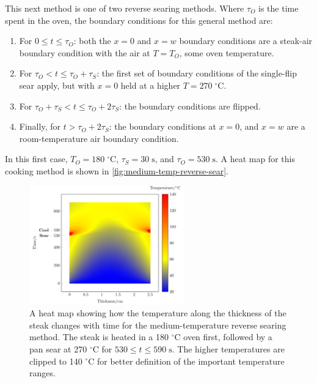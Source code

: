 \documentclass[11pt]{article}
\begin{document}
	This next method is one of two reverse searing methods. Where $\tau_O$ is the time spent in the oven, the boundary conditions for this general method are:
	\begin{enumerate}
		\item For $0 \leq t \leq \tau_O$: both the $x=0$ and $x=w$ boundary conditions are a steak-air boundary condition with the air at $T=T_O$, some oven temperature.
		\item For $\tau_O < t \leq \tau_O + \tau_S$: the first set of boundary conditions of the single-flip sear apply, but with $x=0$ held at a higher $T= 270\;^\circ\mathrm{C}$.
		\item For $\tau_O + \tau_S < t \leq \tau_O + 2\tau_S$: the boundary conditions are flipped.
		\item Finally, for $t > \tau_O + 2\tau_S$: the boundary conditions at $x=0$, and $x=w$ are a room-temperature air boundary condition.
	\end{enumerate}
	
	In this first case, $T_O = 180\;^\circ\mathrm{C}$, $\tau_S = 30\;\mathrm{s}$, and $\tau_O = 530\;\mathrm{s}$. A heat map for this cooking method is shown in \autoref{fig:medium-temp-reverse-sear}.
	
	\begin{figure}[H]
		\centering
		\includegraphics[width=0.6\textwidth]{./img/med-temp-reverse-sear.png}
		\caption{A heat map showing how the temperature along the thickness of the steak changes with time for the medium-temperature reverse searing method. The steak is heated in a 180 $^\circ\text{C}$ oven first, followed by a pan sear at 270 $^\circ \text{C}$ for $530 \leq t \leq 590\;\mathrm{s}$. The higher temperatures are clipped to 140 $^\circ\text{C}$ for better definition of the important temperature ranges.}
		\label{fig:medium-temp-reverse-sear}
	\end{figure}
	
\end{document}
